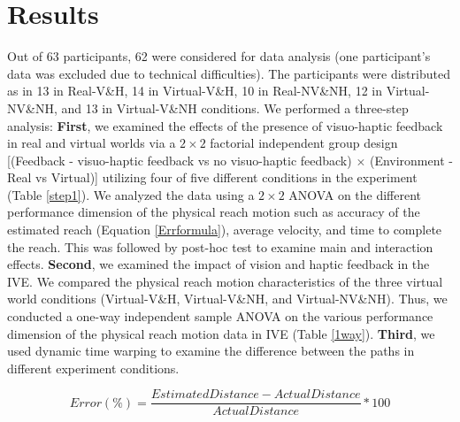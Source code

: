 \section{Results}
Out of 63 participants, 62 were considered for data analysis (one participant's data was excluded due to technical difficulties). The participants were distributed as in 13 in Real-V\&H, 14 in Virtual-V\&H, 10 in Real-NV\&NH, 12 in Virtual-NV\&NH, and 13 in Virtual-V\&NH conditions. We performed a three-step analysis: \textbf{First}, we examined the effects of the presence of visuo-haptic feedback in real and virtual worlds via a $2\times2$ factorial independent group design [(Feedback - visuo-haptic feedback vs no visuo-haptic feedback) $\times$ (Environment - Real vs Virtual)] utilizing four of five different conditions in the experiment (Table \ref{step1}). We analyzed the data using a $2\times2$ ANOVA on the different performance dimension of the physical reach motion such as accuracy of the estimated reach (Equation \ref{Errformula}), average velocity, and time to complete the reach. This was followed by post-hoc test to examine main and interaction effects. \textbf{Second}, we examined the impact of vision and haptic feedback in the IVE. We compared the physical reach motion characteristics of the three virtual world conditions (Virtual-V\&H, Virtual-V\&NH, and Virtual-NV\&NH). Thus, we conducted a one-way independent sample ANOVA on the various performance dimension of the physical reach motion data in IVE (Table \ref{1way}). \textbf{Third}, we used dynamic time warping to examine the difference between the paths in different experiment conditions.

\begin{equation} \label{Errformula}
Error (\%) = \dfrac {Estimated Distance - Actual Distance}{Actual Distance} * 100
\end{equation}

